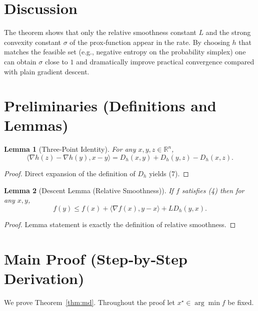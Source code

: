 \documentclass[11pt]{article}
\newtheorem{lemma}{Lemma}
\newcommand{\R}{\mathbb{R}}
\begin{document}
\section*{Discussion}
The theorem shows that only the relative smoothness constant $L$ and the
strong convexity constant $\sigma$ of the prox‑function appear in the
rate.  By choosing $h$ that matches the feasible set (e.g., negative
entropy on the probability simplex) one can obtain $\sigma$ close to $1$
and dramatically improve practical convergence compared with plain
gradient descent.

\section*{Preliminaries (Definitions and Lemmas)}
\begin{lemma}[Three‑Point Identity]
\label{lem:three-point}
For any $x,y,z\in\R^{n}$,
\[
\langle \nabla h(z)-\nabla h(y),x-y\rangle
= D_{h}(x,y)+D_{h}(y,z)-D_{h}(x,z). \tag{7}
\]
\end{lemma}
\begin{proof}
Direct expansion of the definition of $D_{h}$ yields (7). \hfill\qedhere
\end{proof}

\begin{lemma}[Descent Lemma (Relative Smoothness)]
\label{lem:rel-smooth}
If $f$ satisfies (4) then for any $x,y$,
\[
f(y)\le f(x)+\langle\nabla f(x),y-x\rangle+L D_{h}(y,x). \tag{8}
\]
\end{lemma}
\begin{proof}
Lemma statement is exactly the definition of relative smoothness. \hfill\qedhere
\end{proof}

\section*{Main Proof (Step‑by‑Step Derivation)}
We prove Theorem~\ref{thm:md}.  Throughout the proof let $x^{\star}\in
\arg\min f$ be fixed.
\end{document}
